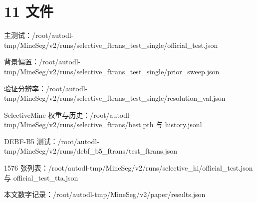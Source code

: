 \documentclass[11pt]{article}
\begin{document}
\section*{11  文件}
主测试：/root/autodl-tmp/MineSeg/v2/runs/selective\_ftrans\_test\_single/official\_test.json

背景偏置：/root/autodl-tmp/MineSeg/v2/runs/selective\_ftrans\_test\_single/prior\_sweep.json

验证分辨率：/root/autodl-tmp/MineSeg/v2/runs/selective\_ftrans\_test\_single/resolution\_val.json

SelectiveMine 权重与历史：/root/autodl-tmp/MineSeg/v2/runs/selective\_ftrans/best.pth 与 history.jsonl

DEBF-B5 测试：/root/autodl-tmp/MineSeg/v2/runs/debf\_b5\_ftrans/test\_ftrans.json

1576 张列表：/root/autodl-tmp/MineSeg/v2/runs/selective\_hi/official\_test.json 与 official\_test\_tta.json

本文数字记录：/root/autodl-tmp/MineSeg/v2/paper/results.json
\end{document}
